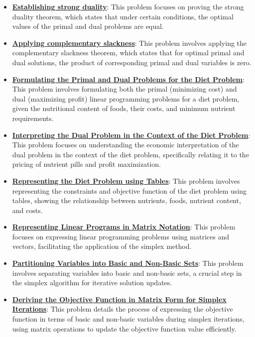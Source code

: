 \documentclass{article}%
\begin{document}
\begin{itemize}[leftmargin=*]
\item \href{https://www.math.purdue.edu/~yipn/421/2024-09-17-DualityGeneral.pdf#page=17}{\textbf{Establishing strong duality}}: This problem focuses on proving the strong duality theorem, which states that under certain conditions, the optimal values of the primal and dual problems are equal.%
\item \href{https://www.math.purdue.edu/~yipn/421/2024-09-17-DualityGeneral.pdf#page=22}{\textbf{Applying complementary slackness}}: This problem involves applying the complementary slackness theorem, which states that for optimal primal and dual solutions, the product of corresponding primal and dual variables is zero.%
\item \href{https://www.math.purdue.edu/~yipn/421/2024-09-19-DualityExamples.pdf#page=5}{\textbf{Formulating the Primal and Dual Problems for the Diet Problem}}: This problem involves formulating both the primal (minimizing cost) and dual (maximizing profit) linear programming problems for a diet problem, given the nutritional content of foods, their costs, and minimum nutrient requirements.%
\item \href{https://www.math.purdue.edu/~yipn/421/2024-09-19-DualityExamples.pdf#page=7}{\textbf{Interpreting the Dual Problem in the Context of the Diet Problem}}: This problem focuses on understanding the economic interpretation of the dual problem in the context of the diet problem, specifically relating it to the pricing of nutrient pills and profit maximization.%
\item \href{https://www.math.purdue.edu/~yipn/421/2024-09-19-DualityExamples.pdf#page=3}{\textbf{Representing the Diet Problem using Tables}}: This problem involves representing the constraints and objective function of the diet problem using tables, showing the relationship between nutrients, foods, nutrient content, and costs.%
\item \href{https://www.math.purdue.edu/~yipn/421/2024-09-24-SimplexMatrix.pdf#page=1}{\textbf{Representing Linear Programs in Matrix Notation}}: This problem focuses on expressing linear programming problems using matrices and vectors, facilitating the application of the simplex method.%
\item \href{https://www.math.purdue.edu/~yipn/421/2024-09-24-SimplexMatrix.pdf#page=4}{\textbf{Partitioning Variables into Basic and Non{-}Basic Sets}}: This problem involves separating variables into basic and non-basic sets, a crucial step in the simplex algorithm for iterative solution updates.%
\item \href{https://www.math.purdue.edu/~yipn/421/2024-09-24-SimplexMatrix.pdf#page=8}{\textbf{Deriving the Objective Function in Matrix Form for Simplex Iterations}}: This problem details the process of expressing the objective function in terms of basic and non-basic variables during simplex iterations, using matrix operations to update the objective function value efficiently.%

\end{itemize}
\end{document}
